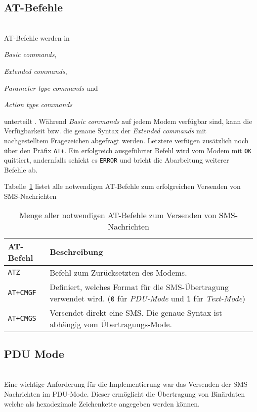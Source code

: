 \documentclass[paper=a4, fontsize=11pt]{scrartcl}
\begin{document}
\subsection{AT-Befehle}~\\
AT-Befehle werden in 
	\begin{inparaenum}[1)]
		\item \textit{Basic commands}, 
		\item \textit{Extended commands}, 
		\item \textit{Parameter type commands} und  
		\item \textit{Action type commands}
	\end{inparaenum} unterteilt \cite{at-befehle}. 
Während \textit{Basic commands} auf jedem Modem verfügbar sind, kann die Verfügbarkeit
bzw. die genaue Syntax der \textit{Extended commands} mit nachgestelltem Fragezeichen
abgefragt werden. Letztere verfügen zusätzlich noch über den Präfix \texttt{AT+}. 
Ein erfolgreich ausgeführter Befehl wird vom Modem mit \texttt{OK} quittiert, andernfalls
schickt es \texttt{ERROR} und bricht die Abarbeitung weiterer Befehle ab.

Tabelle~\ref{tab:at-befehle} listet alle notwendigen AT-Befehle zum erfolgreichen
Versenden von SMS-Nachrichten\\

\begin{table}[H]
	\begin{tabularx}{\textwidth}{l|X}
		\textbf{AT-Befehl} & \textbf{Beschreibung} \\
		\hline
		\texttt{ATZ} & Befehl zum Zurücksetzten des Modems.\\
		\texttt{AT+CMGF} & Definiert, welches Format für die SMS-Übertragung verwendet wird. (\texttt{0} für \textit{PDU-Mode} und \texttt{1} für \textit{Text-Mode})\\
		\texttt{AT+CMGS} & Versendet direkt eine SMS. Die genaue Syntax ist abhängig vom Übertragungs-Mode. \\
	\end{tabularx}
	\caption{Menge aller notwendigen AT-Befehle zum Versenden von SMS-Nachrichten}
	\label{tab:at-befehle}
\end{table}
\subsection{PDU Mode}~\\
Eine wichtige Anforderung für die Implementierung war das Versenden der SMS-Nachrichten
im PDU-Mode. Dieser ermöglicht die Übertragung von Binärdaten welche als hexadezimale Zeichenkette
angegeben werden können.
\end{document}

